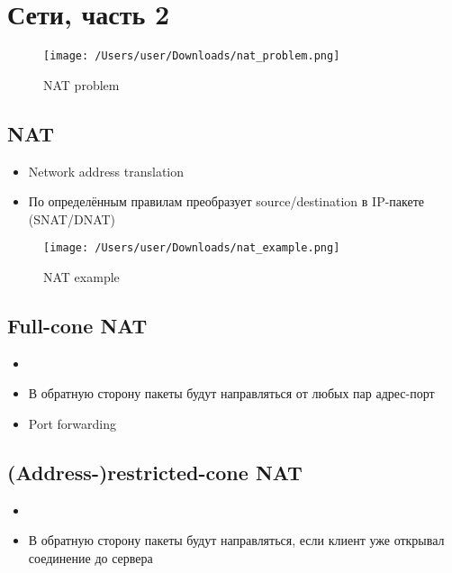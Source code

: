 \newpage
\section{Сети, часть 2}
\begin{figure}[H]
  \centering
  \texttt{[image: /Users/user/Downloads/nat\_problem.png]}
  \caption{NAT problem}
  \label{fig:nat_problem}
\end{figure}

  \subsection{NAT}
    \begin{itemize}
      \item Network address translation
      \item По определённым правилам преобразует source/destination в IP-пакете (SNAT/DNAT)
    \end{itemize}
    
\begin{figure}[H]
  \centering
  \texttt{[image: /Users/user/Downloads/nat\_example.png]}
  \caption{NAT example}
  \label{fig:nat_example}
\end{figure}
  
  \subsection{Full-cone NAT}
    \begin{itemize}
      \item {}
      \item В обратную сторону пакеты будут направляться от любых пар адрес-порт
      \item Port forwarding
    \end{itemize}

  \subsection{(Address-)restricted-cone NAT}
    \begin{itemize}
      \item {}
      \item В обратную сторону пакеты будут направляться, если клиент уже открывал соединение до сервера  
    \end{itemize}
  

